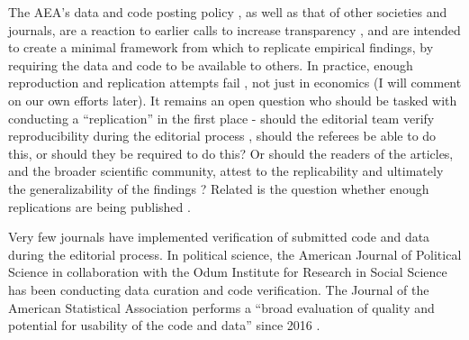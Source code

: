 \documentclass[AEJ]{AEA}
\begin{document}
The \ac{AEA}'s data and code posting policy \citep{American_Economic_Association2008-az}, as well as that of other societies and journals, are a reaction to earlier calls to increase transparency \citep{McCullough2006-cz,AndersonJ.Econ.Methodol.2008}, and are intended to create a minimal framework from which to replicate empirical findings, by requiring the data and code to be available to others. In practice, enough reproduction and replication attempts fail \citep{CamererScience2016,Chang2015-dl,ChangAm.Econ.Rev.2017}, not just in economics \citep{Baker2015-sh,Collaboration2015-ev} (I will comment on our own efforts later). It remains an open question who should be tasked with conducting a ``replication'' in the first place - should the editorial team verify reproducibility during the editorial process \citep{JacobyInsideHigherEd2017}, should the referees be able to do this, or should they be required to do this? Or should the readers of the articles, and the broader scientific community, attest to the replicability and ultimately the generalizability of the findings \citep{Hamermesh2017}? Related is the question whether  enough replications are being published \citep{BerryAm.Econ.Rev.2017,Burman2010-ng,Coffman2017-si,Duvendack2017-js,Hoffler-LibMag.2017}.

Very few journals have implemented verification of submitted code and data during the editorial process. In political science, the American Journal of Political Science in collaboration with the Odum Institute for Research in Social Science \citep{Christian2018} has been conducting data curation and code verification. The Journal of the American Statistical Association performs a ``broad evaluation of quality and potential for usability of the code and data'' since 2016 \citep{Stodden2016-uc}.


\end{document}
